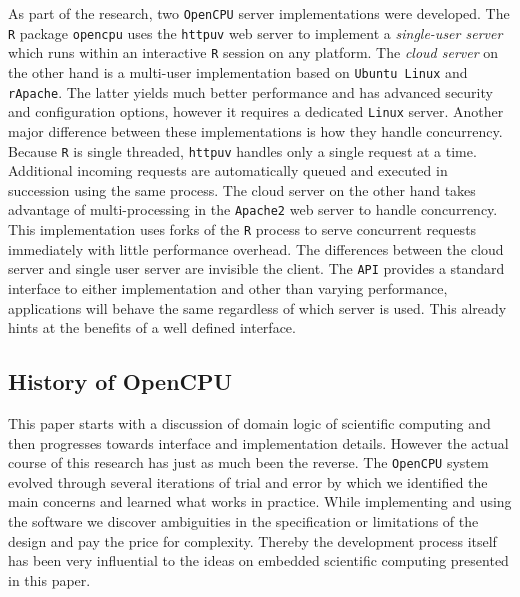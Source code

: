\documentclass{article}
\newcommand{\Linux}{\texttt{Linux}\xspace}
\newcommand{\R}{\texttt{R}\xspace}
\newcommand{\API}{\texttt{API}\xspace}
\newcommand{\OpenCPU}{\texttt{OpenCPU}\xspace}
\begin{document}
As part of the research, two \OpenCPU server implementations were developed. The \R package \texttt{opencpu} uses the \texttt{httpuv} web server \citep{httpuv} to implement a \emph{single-user server} which runs within an interactive \R session on any platform. The \emph{cloud server} on the other hand is a multi-user implementation based on \texttt{Ubuntu Linux} and \texttt{rApache}. The latter yields much better performance and has advanced security and configuration options, however it requires a dedicated \Linux server. Another major difference between these implementations is how they handle concurrency. Because \R is single threaded, \texttt{httpuv} handles only a single request at a time. Additional incoming requests are automatically queued and executed in succession using the same process. The cloud server on the other hand takes advantage of multi-processing in the \texttt{Apache2} web server to handle concurrency. This implementation uses forks of the \R process to serve concurrent requests immediately with little performance overhead. The differences between the cloud server and single user server are invisible the client. The \API provides a standard interface to either implementation and other than varying performance, applications will behave the same regardless of which server is used. This already hints at the benefits of a well defined interface.


\subsection{History of OpenCPU}

This paper starts with a discussion of domain logic of scientific computing and then progresses towards interface and implementation details. However the actual course of this research has just as much been the reverse. The \OpenCPU system evolved through several iterations of trial and error by which we identified the main concerns and learned what works in practice. While implementing and using the software we discover ambiguities in the specification or limitations of the design and pay the price for complexity. Thereby the development process itself has been very influential to the ideas on embedded scientific computing presented in this paper. 
\end{document}
